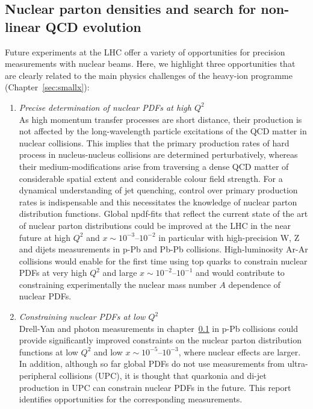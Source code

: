 \documentclass[../report.tex]{subfiles}
\begin{document}
\subsection{Nuclear parton densities and search for non-linear QCD evolution}
Future experiments at the LHC offer a variety of opportunities for precision measurements with nuclear beams. Here, we highlight three opportunities that are clearly related to the main physics challenges of the heavy-ion programme (Chapter~\ref{sec:smallx}):

\begin{enumerate}
\item {\it Precise determination of nuclear PDFs at high $Q^2$}\\ As high momentum transfer processes are short distance, their production is not affected by the long-wavelength particle excitations of the QCD matter in nuclear collisions. This implies that the primary production rates of hard process in nucleus-nucleus collisions are determined perturbatively, whereas their medium-modifications arise from traversing a dense QCD matter of considerable spatial extent and considerable colour field strength. For  a dynamical understanding of jet quenching, control over primary production rates is indispensable and this necessitates the knowledge of nuclear parton distribution functions. Global npdf-fits that reflect the current state of the art of nuclear parton distributions could be improved at the LHC in the near future at high $Q^2$ and $x\sim 10^{-3}$--$10^{-2}$ in particular with high-precision W, Z and dijets measurements in p-Pb and Pb-Pb collisions. High-luminosity Ar-Ar collisions would enable for the first time using top quarks to constrain nuclear PDFs at very high $Q^2$ and large $x\sim 10^{-2}$--$10^{-1}$ and would contribute to constraining experimentally the nuclear mass number $A$ dependence of nuclear PDFs. 
\item {\it Constraining nuclear PDFs at low $Q^2$}\\ Drell-Yan and photon measurements in chapter~\ref{} in p-Pb collisions could provide significantly improved constraints on the nuclear parton distribution functions at low $Q^2$ and low $x\sim 10^{-5}$--$10^{-3}$, where nuclear effects are larger. In addition, although so far global PDFs do not use measurements from ultra-peripheral collisions (UPC), it is thought that quarkonia and di-jet production in UPC can constrain nuclear PDFs in the future. This report identifies opportunities for the corresponding measurements. 

\end{enumerate}
\end{document}
